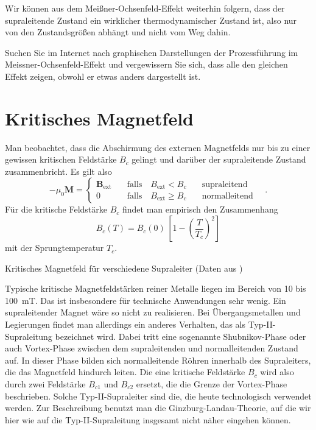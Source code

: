 Wir können aus dem Meißner-Ochsenfeld-Effekt weiterhin folgern, dass der supraleitende Zustand ein wirklicher thermodynamischer Zustand ist, also nur von den Zustandsgrößen abhängt und nicht vom Weg dahin.

\begin{questions} 
\item Suchen Sie im Internet nach graphischen Darstellungen der Prozessführung im Meissner-Ochsenfeld-Effekt und vergewissern Sie sich, dass alle den gleichen Effekt zeigen, obwohl er etwas anders dargestellt ist.
\end{questions}


 
\section*{Kritisches Magnetfeld}

Man beobachtet, dass die Abschirmung des externen Magnetfelds nur bis zu einer gewissen kritischen Feldstärke $B_c$ gelingt und darüber der supraleitende Zustand zusammenbricht. Es gilt also 
\begin{equation}
    - \mu_0 \bm{M} = 
    \left\{
    \begin{matrix}
    \bm{B}_\text{ext} \quad & \text{falls} \quad {B}_\text{ext}  < B_c & \quad \text{supraleitend} \\
    0    & \text{falls} \quad {B}_\text{ext}  \ge B_c  & \quad \text{normalleitend}
\end{matrix}
    \right. \quad .
\end{equation} 
Für die kritische Feldstärke $B_c$ findet man empirisch den Zusammenhang
\begin{equation}
    B_c(T) = B_c(0) \, \left[ 1 - \left( \frac{T}{T_c} \right)^2 \right]
\end{equation}
mit der Sprungtemperatur $T_c$.


\begin{marginfigure}
    \caption{Kritisches Magnetfeld für verschiedene Supraleiter (Daten aus  \cite{Hunklinger2014})}
\end{marginfigure}


Typische kritische Magnetfeldstärken reiner Metalle liegen im Bereich von 10 bis 100~mT. Das ist insbesondere für technische Anwendungen sehr wenig. Ein supraleitender Magnet wäre so nicht zu realisieren. Bei Übergangsmetallen und Legierungen findet man allerdings ein anderes Verhalten, das als Typ-II-Supraleitung bezeichnet wird. Dabei tritt eine sogenannte Shubnikov-Phase oder auch Vortex-Phase zwischen dem supraleitenden und normalleitenden Zustand auf. In dieser Phase bilden sich normalleitende Röhren innerhalb des Supraleiters, die das Magnetfeld hindurch leiten. Die eine kritische Feldstärke $B_c$ wird also durch zwei Feldstärke $B_{c1}$ und  
$B_{c2}$ ersetzt, die die Grenze der Vortex-Phase beschrieben. Solche Typ-II-Supraleiter sind die, die heute technologisch verwendet werden.  Zur Beschreibung benutzt man die Ginzburg-Landau-Theorie, auf die wir hier wie auf die Typ-II-Supraleitung insgesamt nicht näher eingehen können.



